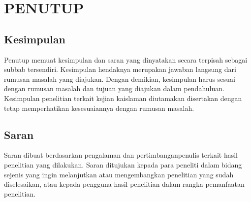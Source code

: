\chapter{PENUTUP}
\section{Kesimpulan}
Penutup memuat kesimpulan dan saran yang dinyatakan secara terpisah sebagai subbab tersendiri. Kesimpulan hendaknya merupakan jawaban langsung dari rumusan masalah yang diajukan. Dengan demikian, kesimpulan harus sesuai dengan rumusan masalah dan tujuan yang diajukan dalam pendahuluan. Kesimpulan penelitian terkait kejian kaislaman diutamakan disertakan dengan tetap memperhatikan kesesuaiannya dengan rumusan masalah.
\section{Saran}
Saran dibuat berdasarkan pengalaman dan pertimbanganpenulis terkait hasil penelitian yang dilakukan. Saran ditujukan kepada para peneliti dalam bidang sejenis yang ingin melanjutkan atau mengembangkan penelitian yang sudah diselesaikan, atau kepada pengguna hasil penelitian dalam rangka pemanfaatan penelitian.
